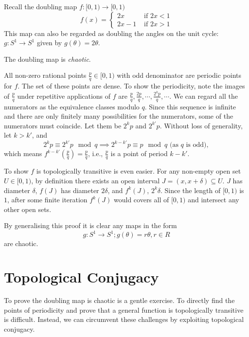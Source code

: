 \begin{example}\label{ex_doubling_map}
	Recall the doubling map $f: [0,1) \rightarrow [0,1)$
	\begin{equation}\label{eq:doubling_map}
	f(x) = 
		\begin{cases}
			2x &\text{ if } 2x < 1 \\
			2x -1 &\text{ if } 2x > 1
		\end{cases}
	\end{equation}
	This map can also be regarded as doubling the angles on the unit cycle: $g: S^1 \rightarrow S^1$ given by $ g(\theta) = 2 \theta$.
	
	The doubling map is \textit{chaotic}.

	All non-zero rational points $\frac{p}{q} \in [0,1)$ with odd denominator are periodic points for $f$. 
	The set of these points are dense.
	To show the periodicity, note the images of $\frac{p}{q}$ under repetitive applications of $f$ are $\frac{p}{q}, \frac{2p}{q}, \cdots, \frac{2^k p}{q}, \cdots$.
	We can regard all the numerators as the equivalence classes modulo $q$.
	Since this sequence is infinite and there are only finitely many possibilities for the numerators, some of the numerators must coincide. Let them be $2^k p$ and $2^{k'} p$. 
	Without loss of generality, let $k > k'$, and
	$$
	2^k p \equiv 2^{k'} p \mod q \implies 
	2^{k-k'} p \equiv p \mod q \text{ (as $q$ is odd)},
	$$
	which means $f^{k-k'}(\frac{p}{q}) = \frac{p}{q}$, i.e., $\frac{p}{q}$ is a point of period $k - k'$.

	To show $f$ is topologically transitive is even easier. 
	For any non-empty open set $U \in [0,1)$, by definition there exists an open interval $J = (x, x+ \delta) \subseteq U$. 
	$J$ has diameter $\delta$, $f(J)$ has diameter $2 \delta$, and $f^k(J)$, $2^k \delta$. 
	Since the length of $[0,1)$ is $1$, after some finite iteration $f^k(J)$ would covers all of $[0,1)$ and intersect any other open sets.

	By generalising this proof it is clear any maps in the form 
	$$
	g: S^1 \rightarrow S^1; g(\theta) = r \theta, r \in R
	$$
	are chaotic.
\end{example}

\section{Topological Conjugacy}

To prove the doubling map is chaotic is a gentle exercise. 
To directly find the points of periodicity and prove that a general function is topologically transitive is difficult.
Instead, we can circumvent these challenges by exploiting topological conjugacy.

